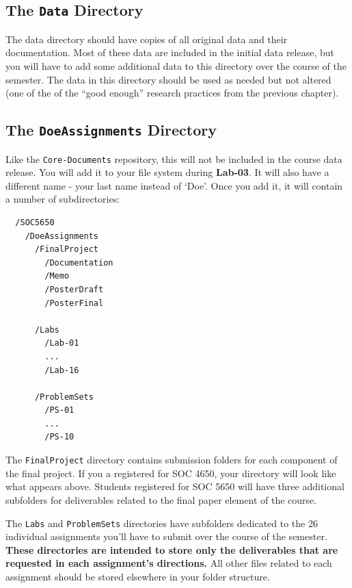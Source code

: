 \documentclass[]{book}
\begin{document}
\subsection{\texorpdfstring{The \texttt{Data}
Directory}{The Data Directory}}\label{the-data-directory}

The data directory should have copies of all original data and their
documentation. Most of these data are included in the initial data
release, but you will have to add some additional data to this directory
over the course of the semester. The data in this directory should be
used as needed but not altered (one of the of the ``good enough''
research practices from the previous chapter).

\subsection{\texorpdfstring{The \texttt{DoeAssignments}
Directory}{The DoeAssignments Directory}}\label{the-doeassignments-directory}

Like the \texttt{Core-Documents} repository, this will not be included
in the course data release. You will add it to your file system during
\textbf{Lab-03}. It will also have a different name - your last name
instead of `Doe'. Once you add it, it will contain a number of
subdirectories:

\begin{verbatim}
  /SOC5650
    /DoeAssignments
      /FinalProject
        /Documentation
        /Memo
        /PosterDraft
        /PosterFinal

      /Labs
        /Lab-01
        ...
        /Lab-16

      /ProblemSets
        /PS-01
        ...
        /PS-10
\end{verbatim}

The \texttt{FinalProject} directory contains submission folders for each
component of the final project. If you a registered for SOC 4650, your
directory will look like what appears above. Students registered for SOC
5650 will have three additional subfolders for deliverables related to
the final paper element of the course.

The \texttt{Labs} and \texttt{ProblemSets} directories have subfolders
dedicated to the 26 individual assignments you'll have to submit over
the course of the semester. \textbf{These directories are intended to
store only the deliverables that are requested in each assignment's
directions.} All other files related to each assignment should be stored
elsewhere in your folder structure.
\end{document}
